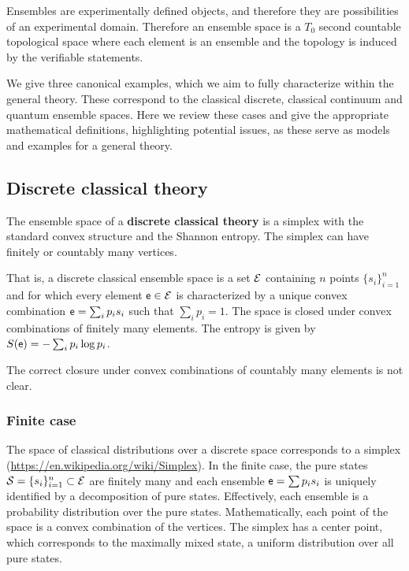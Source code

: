 \begin{mathSection}
\begin{justification}
		Ensembles are experimentally defined objects, and therefore they are possibilities of an experimental domain. Therefore an ensemble space is a $T_0$ second countable topological space where each element is an ensemble and the topology is induced by the verifiable statements.
	\end{justification}
\end{mathSection}

We give three canonical examples, which we aim to fully characterize within the general theory. These correspond to the classical discrete, classical continuum and quantum ensemble spaces. Here we review these cases and give the appropriate mathematical definitions, highlighting potential issues, as these serve as models and examples for a general theory.


\subsection{Discrete classical theory}


\begin{defn}
	The ensemble space of a \textbf{discrete classical theory} is a simplex with the standard convex structure and the Shannon entropy. The simplex can have finitely or countably many vertices.
	
	That is, a discrete classical ensemble space is a set $\mathcal{E}$ containing $n$ points $\{s_i\}^n_{i=1}$ and for which every element $\mathsf{e} \in \mathcal{E}$ is characterized by a unique convex combination $\mathsf{e} = \sum_i p_i s_i$ such that $\sum_i p_i = 1$. The space is closed under convex combinations of finitely many elements. The entropy is given by $S(\mathsf{e}) = - \sum_i p_i \log p_i$.
\end{defn}

\begin{remark}
	The correct closure under convex combinations of countably many elements is not clear.
\end{remark}

\subsubsection{Finite case}

The space of classical distributions over a discrete space corresponds to a simplex (\url{https://en.wikipedia.org/wiki/Simplex}). In the finite case, the pure states $\mathcal{S} = \{s_i\}_{i=1}^{n} \subset \mathcal{E}$ are finitely many and each ensemble $\mathsf{e} = \sum p_i s_i$ is uniquely identified by a decomposition of pure states. Effectively, each ensemble is a probability distribution over the pure states. Mathematically, each point of the space is a convex combination of the vertices. The simplex has a center point, which corresponds to the maximally mixed state, a uniform distribution over all pure states. 

